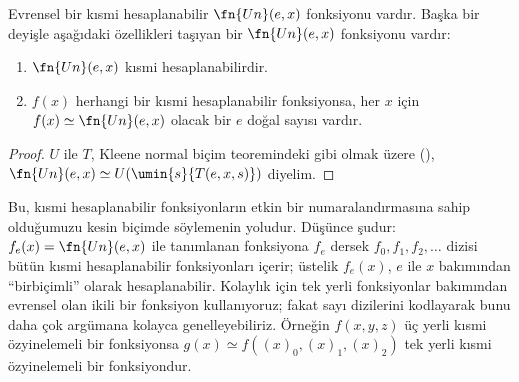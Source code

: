 


\begin{thm}
Evrensel bir kısmi hesaplanabilir $\fn{Un}(e,x)$ fonksiyonu vardır. Başka bir
deyişle aşağıdaki özellikleri taşıyan bir $\fn{Un}(e,x)$ fonksiyonu vardır:
\begin{enumerate}
\item $\fn{Un}(e,x)$ kısmi hesaplanabilirdir.
\item $f(x)$ herhangi bir kısmi hesaplanabilir fonksiyonsa, her $x$ için
  $f(x)\simeq\fn{Un}(e,x)$ olacak bir $e$ doğal sayısı vardır.
\end{enumerate}
\end{thm}

\begin{proof}
$U$ ile $T$, Kleene normal biçim teoremindeki gibi olmak üzere
(),
$\fn{Un}(e,x)\simeq U(\umin{s}{T(e,x,s)})$ diyelim.
\end{proof}

\begin{explain}
Bu, kısmi hesaplanabilir fonksiyonların etkin bir numaralandırmasına sahip
olduğumuzu kesin biçimde söylemenin yoludur. Düşünce şudur:
$f_e(x)=\fn{Un}(e,x)$ ile tanımlanan fonksiyona $f_e$ dersek
$f_0,f_1,f_2,\dots$ dizisi bütün kısmi hesaplanabilir fonksiyonları içerir;
üstelik $f_e(x)$, $e$ ile $x$ bakımından ``birbiçimli'' olarak
hesaplanabilir. Kolaylık için tek yerli fonksiyonlar bakımından evrensel olan
ikili bir fonksiyon kullanıyoruz; fakat sayı dizilerini kodlayarak bunu daha
çok argümana kolayca genelleyebiliriz. Örneğin $f(x,y,z)$ üç yerli kısmi
özyinelemeli bir fonksiyonsa
$g(x)\simeq f((x)_0,(x)_1,(x)_2)$ tek yerli kısmi özyinelemeli bir
fonksiyondur.
\end{explain}

